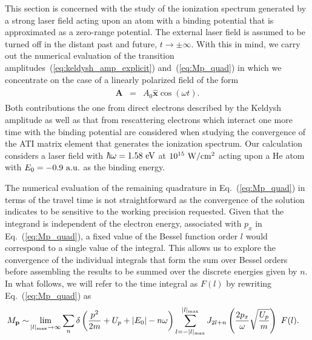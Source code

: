 This section is concerned with the study of the ionization spectrum
generated by a strong laser field acting upon an atom with a binding
potential that is approximated as a zero-range potential. The external
laser field is assumed to be turned off in the distant past and
future, $t\to\pm\infty$. With this in mind, we carry out the numerical
evaluation of the transition
amplitudes~(\ref{eq:keldysh_amp_explicit}) and~(\ref{eq:Mp_quad}) in
which we concentrate on the case of a linearly polarized field of the
form
%
\begin{eqnarray}
\label{eq:lp_field}
\begin{split}
\mathbf{A} & = & A_{0}\hat{\mathbf{x}} \cos(\omega t).
\end{split}
\end{eqnarray}
%
Both contributions the one from direct electrons described by the
Keldysh amplitude as well as that from rescattering electrons which
interact one more time with the binding potential are considered when
studying the convergence of the ATI matrix element that generates the
ionization spectrum. Our calculation considers a laser field with
$\hbar\omega = 1.58\ \rm{eV}$ at $10^{15}\ \rm{W}/\rm{cm}^{2}$ acting
upon a He atom with $E_{0} = -0.9\ \rm{a.u.}$ as the binding energy.

The numerical evaluation of the remaining quadrature in
Eq.~(\ref{eq:Mp_quad}) in terms of the travel time is not
straightforward as the convergence of the solution indicates to be
sensitive to the working precision requested. Given that the integrand
is independent of the electron energy, associated with $p_{x}$ in
Eq.~(\ref{eq:Mp_quad}), a fixed value of the Bessel function order $l$
would correspond to a single value of the integral. This allows us to
explore the convergence of the individual integrals that form the sum
over Bessel orders before assembling the results to be summed over the
discrete energies given by $n$. In what follows, we will refer to the
time integral as $F(l)$ by rewriting Eq.~(\ref{eq:Mp_quad}) as
%
\begin{eqnarray}
\label{eq:Mp_rew}
\begin{split}
M_{\mathbf{p}} \sim &
  \lim\limits_{|l|_{\rm{max}}\to\infty}
\sum\limits_{n} \delta\left(\frac{p^{2}}{2m} + U_{p} + |E_{0}| - n\omega\right)
\sum\limits_{l=-|l|_{\rm{max}}}\limits^{|l|_{\rm{max}}}
J_{2l+n}\left( \frac{2p_{x}}{\omega} \sqrt{\frac{U_{p}}{m}} \right)\ F(l).
\end{split}
\end{eqnarray}
%

